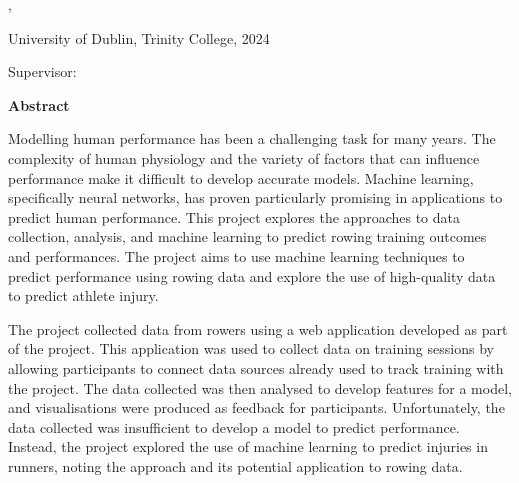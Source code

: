 \thispagestyle{plain}
\begin{center}
  \vspace{3cm}
  \textbf{\Huge\thesistitle}

  \begin{minipage}{12cm}
    \begin{center}
      \thesissubtitle
    \end{center}
  \end{minipage}

  \vspace{1cm}

  \authorname, \degree

  University of Dublin, Trinity College, 2024

  Supervisor: \supervisor

  \vspace{1.5cm}
  \textbf{Abstract}
\end{center}


Modelling human performance has been a challenging task for many years. The complexity of human physiology and the variety of factors that can influence performance make it difficult to develop accurate models. Machine learning, specifically neural networks, has proven particularly promising in applications to predict human performance. This project explores the approaches to data collection, analysis, and machine learning to predict rowing training outcomes and performances. The project aims to use machine learning techniques to predict performance using rowing data and explore the use of high-quality data to predict athlete injury. 

The project collected data from rowers using a web application developed as part of the project. This application was used to collect data on training sessions by allowing participants to connect data sources already used to track training with the project. The data collected was then analysed to develop features for a model, and visualisations were produced as feedback for participants. Unfortunately, the data collected was insufficient to develop a model to predict performance. Instead, the project explored the use of machine learning to predict injuries in runners, noting the approach and its potential application to rowing data.

